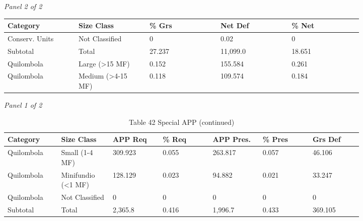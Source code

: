 \documentclass[12pt]{article}
\begin{document}
\begin{landscape}
\begin{table}[H]
\textit{Panel 2 of 2}\\[2pt]
{\fontsize{12}{14}\selectfont
\setlength{\tabcolsep}{3pt}
\renewcommand{\arraystretch}{1.08}
\begin{tabular}{p{0.164\linewidth}p{0.164\linewidth}p{0.164\linewidth}p{0.164\linewidth}p{0.164\linewidth}}
\toprule
Category & Size Class & \% Grs & Net Def & \% Net \\
\midrule
Conserv. Units & Not Classified & 0 & 0.02 & 0 \\
Subtotal & Total & 27.237 & 11,099.0 & 18.651 \\
Quilombola & Large (>15 MF) & 0.152 & 155.584 & 0.261 \\
Quilombola & Medium (>4-15 MF) & 0.118 & 109.574 & 0.184 \\
\bottomrule
\end{tabular}
}
\end{table}
\begin{table}[H]
\centering
\caption{Table 42 Special APP (continued)}
\textit{Panel 1 of 2}\\[2pt]
{\fontsize{12}{14}\selectfont
\setlength{\tabcolsep}{3pt}
\renewcommand{\arraystretch}{1.08}
\begin{tabular}{p{0.117\linewidth}p{0.117\linewidth}p{0.117\linewidth}p{0.117\linewidth}p{0.117\linewidth}p{0.117\linewidth}p{0.117\linewidth}}
\toprule
Category & Size Class & APP Req & \% Req & APP Pres. & \% Pres & Grs Def \\
\midrule
Quilombola & Small (1-4 MF) & 309.923 & 0.055 & 263.817 & 0.057 & 46.106 \\
Quilombola & Minifundio (<1 MF) & 128.129 & 0.023 & 94.882 & 0.021 & 33.247 \\
Quilombola & Not Classified & 0 & 0 & 0 & 0 & 0 \\
Subtotal & Total & 2,365.8 & 0.416 & 1,996.7 & 0.433 & 369.105 \\
\bottomrule
\end{tabular}
}

\vspace{0.6em}


\end{table}
\end{landscape}
\end{document}
